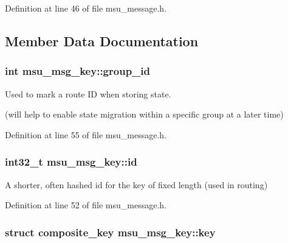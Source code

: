 Definition at line 46 of file msu\-\_\-message.\-h.



\subsection{Member Data Documentation}
\hypertarget{structmsu__msg__key_abd3cdf7b3585111dd56ca9ceba361dba}{
\subsubsection[{group\-\_\-id}]{\setlength{\rightskip}{0pt plus 5cm}int msu\-\_\-msg\-\_\-key\-::group\-\_\-id}}\label{structmsu__msg__key_abd3cdf7b3585111dd56ca9ceba361dba}


Used to mark a route I\-D when storing state. 

(will help to enable state migration within a specific group at a later time) 

Definition at line 55 of file msu\-\_\-message.\-h.

\hypertarget{structmsu__msg__key_afb9b6ad4c4a66b7c984e54e508073976}{
\subsubsection[{id}]{\setlength{\rightskip}{0pt plus 5cm}int32\-\_\-t msu\-\_\-msg\-\_\-key\-::id}}\label{structmsu__msg__key_afb9b6ad4c4a66b7c984e54e508073976}


A shorter, often hashed id for the key of fixed length (used in routing) 



Definition at line 52 of file msu\-\_\-message.\-h.

\hypertarget{structmsu__msg__key_ad443ba50619f77048500191f4296571e}{
\subsubsection[{key}]{\setlength{\rightskip}{0pt plus 5cm}struct {\bf composite\-\_\-key} msu\-\_\-msg\-\_\-key\-::key}}\label{structmsu__msg__key_ad443ba50619f77048500191f4296571e}


